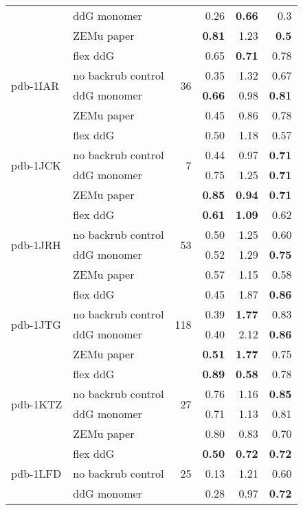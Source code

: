 \begin{longtable}{llrrrr}
 & ddG monomer & & 0.26 & \textbf{0.66} & 0.3  \\
 & ZEMu paper & & \textbf{0.81} & 1.23 & \textbf{0.5}  \\
\hline
 \multirow{ 4}{*}{pdb-1IAR} & flex ddG & \multirow{ 4}{*}{36} & 0.65 & \textbf{0.71} & 0.78  \\
 & no backrub control & & 0.35 & 1.32 & 0.67  \\
 & ddG monomer & & \textbf{0.66} & 0.98 & \textbf{0.81}  \\
 & ZEMu paper & & 0.45 & 0.86 & 0.78  \\
\hline
 \multirow{ 4}{*}{pdb-1JCK} & flex ddG & \multirow{ 4}{*}{7} & 0.50 & 1.18 & 0.57  \\
 & no backrub control & & 0.44 & 0.97 & \textbf{0.71}  \\
 & ddG monomer & & 0.75 & 1.25 & \textbf{0.71}  \\
 & ZEMu paper & & \textbf{0.85} & \textbf{0.94} & \textbf{0.71}  \\
\hline
 \multirow{ 4}{*}{pdb-1JRH} & flex ddG & \multirow{ 4}{*}{53} & \textbf{0.61} & \textbf{1.09} & 0.62  \\
 & no backrub control & & 0.50 & 1.25 & 0.60  \\
 & ddG monomer & & 0.52 & 1.29 & \textbf{0.75}  \\
 & ZEMu paper & & 0.57 & 1.15 & 0.58  \\
\hline
 \multirow{ 4}{*}{pdb-1JTG} & flex ddG & \multirow{ 4}{*}{118} & 0.45 & 1.87 & \textbf{0.86}  \\
 & no backrub control & & 0.39 & \textbf{1.77} & 0.83  \\
 & ddG monomer & & 0.40 & 2.12 & \textbf{0.86}  \\
 & ZEMu paper & & \textbf{0.51} & \textbf{1.77} & 0.75  \\
\hline
 \multirow{ 4}{*}{pdb-1KTZ} & flex ddG & \multirow{ 4}{*}{27} & \textbf{0.89} & \textbf{0.58} & 0.78  \\
 & no backrub control & & 0.76 & 1.16 & \textbf{0.85}  \\
 & ddG monomer & & 0.71 & 1.13 & 0.81  \\
 & ZEMu paper & & 0.80 & 0.83 & 0.70  \\
\hline
 \multirow{ 4}{*}{pdb-1LFD} & flex ddG & \multirow{ 4}{*}{25} & \textbf{0.50} & \textbf{0.72} & \textbf{0.72}  \\
 & no backrub control & & 0.13 & 1.21 & 0.60  \\
 & ddG monomer & & 0.28 & 0.97 & \textbf{0.72}  \\

\end{longtable}
